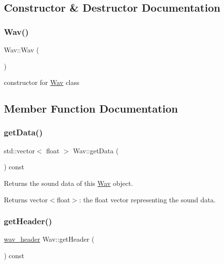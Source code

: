 \subsection{Constructor \& Destructor Documentation}
\mbox{\label{classWav_a23e1700f87bc1b794819be1f819b7272}} 
\subsubsection{\texorpdfstring{Wav()}{Wav()}}
{\footnotesize\ttfamily Wav\+::\+Wav (\begin{DoxyParamCaption}{ }\end{DoxyParamCaption})\hspace{0.3cm}{\ttfamily [default]}}

constructor for \hyperlink{classWav}{Wav} class 

\subsection{Member Function Documentation}
\mbox{\label{classWav_a253ddb3b27bc08e7bc9e3b3fc027341d}} 
\subsubsection{\texorpdfstring{get\+Data()}{getData()}}
{\footnotesize\ttfamily std\+::vector$<$ float $>$ Wav\+::get\+Data (\begin{DoxyParamCaption}{ }\end{DoxyParamCaption}) const}

Returns the sound data of this \hyperlink{classWav}{Wav} object. \begin{DoxyReturn}{Returns}
vector$<$float$>$\+: the float vector representing the sound data. 
\end{DoxyReturn}
\mbox{\label{classWav_a0e3b4a459b2a947b6513f97023fd1e26}} 
\subsubsection{\texorpdfstring{get\+Header()}{getHeader()}}
{\footnotesize\ttfamily \hyperlink{structwav__header}{wav\+\_\+header} Wav\+::get\+Header (\begin{DoxyParamCaption}{ }\end{DoxyParamCaption}) const}

